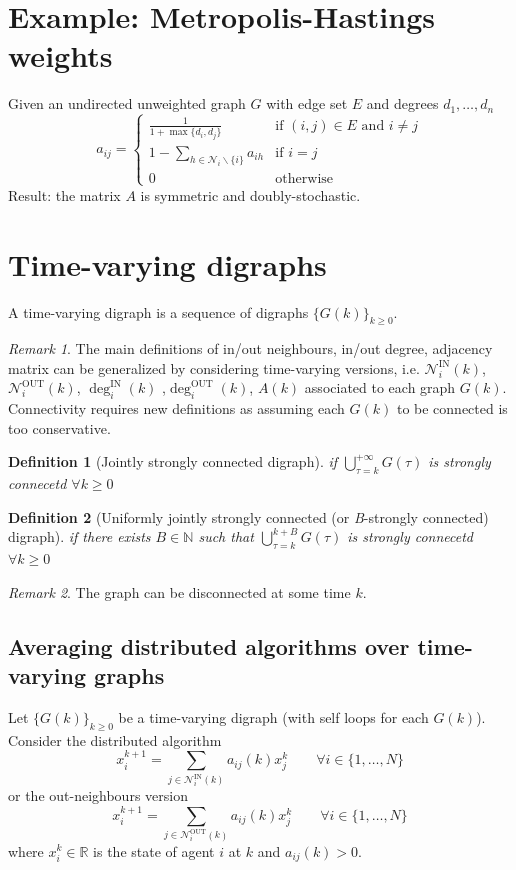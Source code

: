 \documentclass{book}
\newcommand{\R}{\mathbb{R}}
\newcommand{\N}{\mathbb{N}}
\theoremstyle{theoremv2}
\theoremstyle{defv2}
\newtheorem{definition}{Definition}[chapter]
\theoremstyle{remark}
\newtheorem*{remark}{Remark}
\theoremstyle{remark}
\theoremstyle{definition}
\theoremstyle{definition}
\begin{document}
\section{Example: Metropolis-Hastings weights}
Given an undirected unweighted graph $G$ with edge set $E$ and degrees $d_1,\dots,d_n$
\[
    a_{ij} = \begin{cases}
        \displaystyle\frac{1}{1+\max\{d_i,d_j\}} & \text{if } (i,j)\in E \text{ and } i\neq j\\
        1- \displaystyle\sum_{h\in\mathcal{N}_i \backslash \{i\}}^{} a_{ih} & \text{if } i=j\\ 
        0 & \text{otherwise}
    \end{cases}
\]
Result: the matrix $A$ is symmetric and doubly-stochastic.

\section{Time-varying digraphs}
A time-varying digraph is a sequence of digraphs $\{G(k)\}_{k\geq 0}$.
\begin{remark}
    The main definitions of in/out neighbours, in/out degree, adjacency matrix can be generalized by considering time-varying versions, i.e. $\mathcal{N}_i^{\text{IN}}(k)$, $\mathcal{N}_i^{\text{OUT}}(k)$, $\deg_i^{\text{IN}}(k)$ ,$\deg_i^{\text{OUT}}(k)$, $A(k)$ associated to each graph $G(k)$. Connectivity requires new definitions as assuming each $G(k)$ to be connected is too conservative.
\end{remark}
\begin{definition}[Jointly strongly connected digraph]
    if $\bigcup_{\tau=k}^{+\infty}G(\tau)$ is strongly connecetd $\forall k \geq 0$
\end{definition}

\begin{definition}[Uniformly jointly strongly connected (or \emph{B}-strongly connected) digraph]
    if there exists $B\in\N$ such that $\bigcup_{\tau=k}^{k+B}G(\tau)$ is strongly connecetd $\forall k \geq 0$
\end{definition}

\begin{remark}
    The graph can be disconnected at some time $k$.
\end{remark}

\subsection{Averaging distributed algorithms over time-varying graphs}
Let $\{G(k)\}_{k\geq 0}$ be a time-varying digraph (with self loops for each $G(k)$). Consider the distributed algorithm 
\[
    x_i^{k+1} = \displaystyle\sum_{j\in\mathcal{N}_i^\text{IN}(k)}a_{ij}(k)x_j^k \qquad \forall i \in\{1,\dots,N\} 
\]
or the out-neighbours version 
\[
    x_i^{k+1} = \displaystyle\sum_{j\in\mathcal{N}_i^\text{OUT}(k)}a_{ij}(k)x_j^k \qquad \forall i \in\{1,\dots,N\} 
\]
where $x_i^k\in\R$ is the state of agent $i$ at $k$ and $a_{ij}(k)>0$. 
\end{document}

